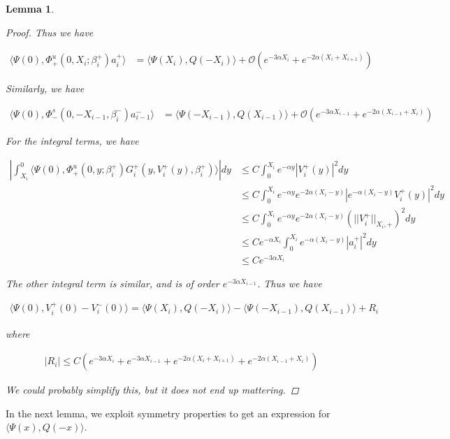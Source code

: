 \documentclass[12pt]{article}
\newtheorem{lemma}{Lemma}
\begin{document}
\begin{lemma}
\begin{proof}
Thus we have

\begin{align*}
\langle \Psi(0), \Phi^u_+(0, X_i; \beta_i^+) a_i^+ \rangle
&= \langle \Psi(X_i), Q(-X_i) \rangle + \mathcal{O}(e^{-3 \alpha X_i} + e^{-2 \alpha (X_i + X_{i+1})})
\end{align*}

Similarly, we have

\begin{align*}
 \langle \Psi(0), \Phi^s_-(0, -X_{i-1}, \beta_i^-) a_{i-1}^- \rangle 
&= \langle \Psi(-X_{i-1}), Q(X_{i-1}) \rangle + \mathcal{O}(e^{-3 \alpha X_{i-1}} + e^{-2 \alpha (X_{i-1} + X_i)}) 
\end{align*}

For the integral terms, we have

\begin{align*}
\left| \int_{X_i}^0 \langle \Psi(0), \Phi_+^u(0, y; \beta_i^+) G_i^+(y, V_i^+(y),\beta_i^+) \rangle \right| dy &\leq C \int_0^{X_i} e^{-\alpha y} |V_i^+(y)|^2 dy \\
&\leq C \int_0^{X_i} e^{-\alpha y} e^{-2 \alpha(X_i - y)}|e^{-\alpha (X_i - y)} V_i^+(y)|^2 dy \\
&\leq C \int_0^{X_i} e^{-\alpha y} e^{-2 \alpha(X_i - y)}(||V_i^+||_{X_i, +})^2 dy \\
&\leq C e^{-\alpha X_i} \int_0^{X_i} e^{-\alpha (X_i - y)} |a_i^+|^2 dy \\
&\leq C e^{-3 \alpha X_i}
\end{align*}

The other integral term is similar, and is of order $e^{-3 \alpha X_{i-1}}$. Thus we have

\begin{align*}
\langle \Psi(0), V_i^+(0) - V_i^-(0) \rangle = 
\langle \Psi(X_i), Q(-X_i) \rangle - \langle \Psi(-X_{i-1}), Q(X_{i-1}) \rangle + R_i
\end{align*}

where 

\begin{align*}
|R_i| \leq C ( e^{-3 \alpha X_i} +  e^{-3 \alpha X_{i-1}}
+ e^{-2 \alpha (X_i + X_{i+1})} + e^{-2 \alpha (X_{i-1} + X_i)})
\end{align*}

We could probably simplify this, but it does not end up mattering.

\end{proof}
\end{lemma}

In the next lemma, we exploit symmetry properties to get an expression for $\langle \Psi(x), Q(-x) \rangle$.
\end{document}
